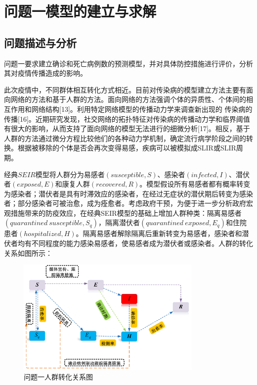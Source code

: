 \documentclass{whutmod}
\begin{document}
	\section{问题一模型的建立与求解}
		\subsection{问题描述与分析}
			问题一要求建立确诊和死亡病例数的预测模型，并对具体防控措施进行评价，分析其对疫情传播造成的影响。
			
			此次疫情中，不同群体相互转化方式相近。目前对传染病的模型建立方法主要有面向网络的方法和基于人群的方法。面向网络的方法强调个体的异质性、个体间的相互作用和网络结构[13]。利用特定网络模型的传播动力学来调查新出现的 传染病的传播[16]。近期研究发现，社交网络的拓扑特征对传染病的传播动力学和临界阈值有很大的影响，从而支持了面向网络的模型无法进行的细微分析[17]。相反，基于人群的方法通过微分方程比较他们的各种动力学机制，确定流行病学阶段之间的转换。根据被移除的个体是否会再次变得易感，疾病可以被模拟成SLIR或SLIR周期。
			
			经典$SEIR$模型将人群分为易感者$(susceptible,S)$、感染者$(infected,I)$、潜伏者$(exposed,E)$和康复人群$(recovered,R)$。模型假设所有易感者都有概率转变为感染者；潜伏者是具有时滞效应的感染者，在经过无症状的潜伏期后转变为感染者；部分感染者可被治愈，成为痊愈者。考虑政府干预，为便于进一步分析政府宏观措施带来的防疫效应，在经典SEIR模型的基础上增加人群种类：隔离易感者$(quarantined\ susceptible, S_q)$，隔离潜伏者$(quarantined\ exposed, E_q)$和住院患者$(hospitalized,H)$。隔离易感者解除隔离后重新转变为易感者，感染者和潜伏者均有不同程度的能力感染易感者，使易感者成为潜伏者或感染者。人群的转化关系如图所示：
			\begin{figure}[H]
				\centering
				\includegraphics[width=0.8\textwidth]{figures/kkkk.png}
				\caption{问题一人群转化关系图}\label{lct}
			\end{figure}
			
\end{document}
